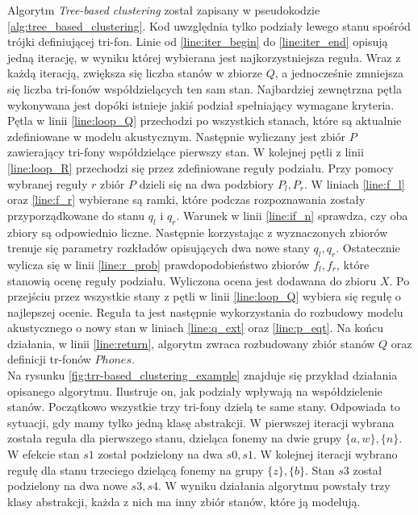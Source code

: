 \documentclass[shortabstract, mgr]{iithesis}
\begin{document}
	Algorytm \textit{Tree-based clustering} został zapisany w pseudokodzie \ref{alg:tree_based_clustering}. Kod uwzględnia tylko podziały lewego stanu spośród trójki definiującej tri-fon. Linie od \ref{line:iter_begin} do \ref{line:iter_end} opisują jedną iterację, w wyniku której wybierana jest najkorzystniejsza reguła. Wraz z każdą iteracją, zwiększa się liczba stanów w zbiorze $Q$, a jednocześnie zmniejsza się liczba tri-fonów współdzielących ten sam stan. Najbardziej zewnętrzna pętla wykonywana jest dopóki istnieje jakiś  podział spełniający wymagane kryteria. Pętla w linii \ref{line:loop_Q} przechodzi po wszystkich stanach, które są aktualnie zdefiniowane w modelu akustycznym. Następnie wyliczany jest zbiór $P$ zawierający tri-fony współdzielące pierwszy stan. W kolejnej pętli z linii \ref{line:loop_R} przechodzi się przez zdefiniowane reguły podziału. Przy pomocy wybranej reguły $r$ zbiór $P$ dzieli się na dwa podzbiory $P_l, P_r$. W liniach \ref{line:f_l} oraz \ref{line:f_r} wybierane są ramki, które podczas rozpoznawania zostały przyporządkowane do stanu $q_l$ i $q_r$. Warunek w linii \ref{line:if_n} sprawdza, czy oba zbiory są odpowiednio liczne. Następnie korzystając z wyznaczonych zbiorów trenuje się parametry rozkładów opisujących dwa nowe stany $q_l, q_r$. Ostatecznie wylicza się w linii \ref{line:r_prob} prawdopodobieństwo zbiorów $f_l, f_r$, które stanowią ocenę reguły podziału. Wyliczona ocena jest dodawana do zbioru $X$. Po przejściu przez wszystkie stany z pętli w linii \ref{line:loop_Q} wybiera się regułę o najlepszej ocenie. Reguła ta jest następnie wykorzystania do rozbudowy modelu akustycznego o nowy stan w liniach \ref{line:q_ext} oraz \ref{line:p_eqt}. Na końcu działania, w linii \ref{line:return}, algorytm zwraca rozbudowany zbiór stanów $Q$ oraz definicji tr-fonów $Phones$.\\
	Na rysunku \ref{fig:trr-based_clustering_example} znajduje się przykład działania opisanego algorytmu. Ilustruje on, jak podziały wpływają na współdzielenie stanów. Początkowo wszystkie trzy tri-fony dzielą te same stany. Odpowiada to sytuacji, gdy mamy tylko jedną klasę abstrakcji. W pierwszej iteracji wybrana została reguła dla pierwszego stanu, dzieląca fonemy na dwie grupy $\{a,w\},\{n\}$. W efekcie stan $s1$ został podzielony na dwa $s0,s1$. W kolejnej iteracji wybrano regułę dla stanu trzeciego dzielącą fonemy na grupy $\{z\},\{b\}$. Stan $s3$ został podzielony na dwa nowe $s3,s4$. W wyniku działania algorytmu powstały trzy klasy abstrakcji, każda z nich ma inny zbiór stanów, które ją modelują. \\
\end{document}
